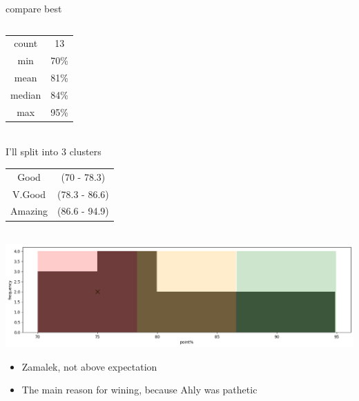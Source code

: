 \documentclass[8pt]{beamer}
\begin{document}
\begin{frame}[t]{compare best}
\begin{columns}
\begin{column}{.7\textwidth}
\begin{center}
                        \begin{tabular}[1]{|c|c|}
                            \hline
                            count & 13\\
                            min & 70\%\\
                            mean & 81\%\\
                            median & 84\%\\
                            max & 95\%\\
                            \hline
                        \end{tabular}
                        \\[5px]
                        I'll split into 3 clusters\\
                        \begin{tabular}{|c|c|}
                            \hline
                            Good & (70 - 78.3)\\
                            V.Good & (78.3 - 86.6)\\
                            Amazing & (86.6 - 94.9)\\
                            \hline
                        \end{tabular}
                        \\[5px]
                        \pause
                        \includegraphics[width=\textwidth]{pics/dist.png}
                    \end{center}
                    \begin{itemize}
                        \item Zamalek, not above expectation
                        \item The main reason for wining, because Ahly was pathetic
                    \end{itemize}
                \end{column}
            \end{columns}
        \end{frame}
\end{document}
